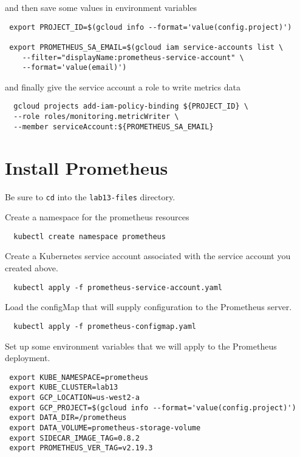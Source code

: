 \documentclass{article}
\begin{document}
and then save some values in environment variables

\begin{verbatim}
 export PROJECT_ID=$(gcloud info --format='value(config.project)')
 
 export PROMETHEUS_SA_EMAIL=$(gcloud iam service-accounts list \
    --filter="displayName:prometheus-service-account" \
    --format='value(email)')
\end{verbatim}

and finally give the service account a role to write metrics data

\begin{verbatim}
  gcloud projects add-iam-policy-binding ${PROJECT_ID} \
  --role roles/monitoring.metricWriter \
  --member serviceAccount:${PROMETHEUS_SA_EMAIL}
\end{verbatim}

\section{Install Prometheus}
Be sure to \texttt{cd} into the \texttt{lab13-files} directory.

Create a namespace for the prometheus resources

\begin{verbatim}
  kubectl create namespace prometheus
\end{verbatim}  

Create a Kubernetes service account associated with the service account you created above.

\begin{verbatim}
  kubectl apply -f prometheus-service-account.yaml
\end{verbatim}

  
Load the configMap that will supply configuration to the Prometheus server.

\begin{verbatim}
  kubectl apply -f prometheus-configmap.yaml
\end{verbatim}

Set up some environment variables that we will apply to the Prometheus deployment.

\begin{verbatim}
 export KUBE_NAMESPACE=prometheus
 export KUBE_CLUSTER=lab13
 export GCP_LOCATION=us-west2-a
 export GCP_PROJECT=$(gcloud info --format='value(config.project)')
 export DATA_DIR=/prometheus
 export DATA_VOLUME=prometheus-storage-volume
 export SIDECAR_IMAGE_TAG=0.8.2
 export PROMETHEUS_VER_TAG=v2.19.3
\end{verbatim} 
\end{document}

